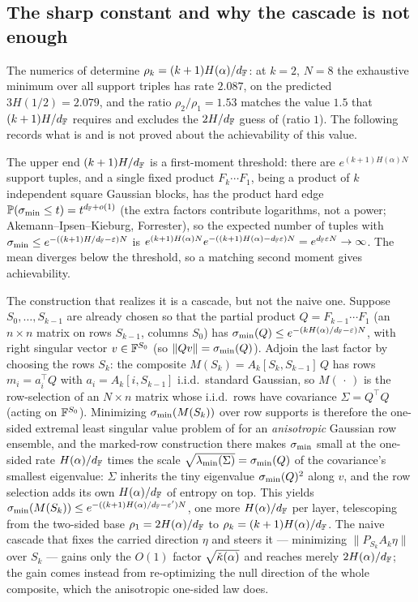 \subsection{The sharp constant and why the cascade is not enough}
\begin{remark}[Achievability of $(k+1)H/\dF$]\label{rem:achieve}
The numerics of  determine $\rho_k=(k+1)H(\alpha)/d_{\mathbb{F}}$: at $k=2$, $N=8$ the exhaustive
minimum over all support triples has rate $2.087$, on the predicted $3H(1/2)=2.079$, and the ratio
$\rho_2/\rho_1=1.53$ matches the value $1.5$ that $(k+1)H/\dF$ requires and excludes the $2H/d_{\mathbb{F}}$ guess of
\cite{shmaloProducts} (ratio $1$). The following records what is and is not proved about the
achievability of this value.

The upper end $(k+1)H/\dF$ is a first-moment threshold: there are $e^{(k+1)H(\alpha)N}$ support tuples, and
a single fixed product $F_k\cdots F_1$, being a product of $k$ independent square Gaussian blocks, has the
product hard edge $\mathbb{P}(\sigma_{\min}\le t)=t^{d_{\mathbb{F}}+o(1)}$ (the extra factors contribute logarithms, not a power;
Akemann--Ipsen--Kieburg, Forrester), so the expected number of tuples with $\sigma_{\min}\le
e^{-((k+1)H/d_{\mathbb{F}}-\varepsilon)N}$ is $e^{(k+1)H(\alpha)N}e^{-((k+1)H(\alpha)-d_{\mathbb{F}}\varepsilon)N}=e^{d_{\mathbb{F}}\varepsilon N}\to\infty$. The
mean diverges below the threshold, so a matching second moment gives achievability.

The construction that realizes it is a cascade, but not the naive one. Suppose $S_0,\dots,S_{k-1}$ are
already chosen so that the partial product $Q=F_{k-1}\cdots F_1$ (an $n\times n$ matrix on rows $S_{k-1}$,
columns $S_0$) has $\sigma_{\min}(Q)\le e^{-(kH(\alpha)/d_{\mathbb{F}}-\varepsilon)N}$, with right singular vector $v\in\mathbb{F}^{S_0}$ (so
$\|Qv\|=\sigma_{\min}(Q)$). Adjoin the last factor by choosing the rows $S_k$: the composite
$M(S_k)=A_k[S_k,S_{k-1}]\,Q$ has rows $m_i=a_i^\top Q$ with $a_i=A_k[i,S_{k-1}]$ i.i.d.\ standard Gaussian,
so $M(\,\cdot\,)$ is the row-selection of an $N\times n$ matrix whose i.i.d.\ rows have covariance
$\Sigma=Q^\top Q$ (acting on $\mathbb{F}^{S_0}$). Minimizing $\sigma_{\min}(M(S_k))$ over row supports is therefore the
one-sided extremal least singular value problem of \cite{shmaloBAMS} for an \emph{anisotropic} Gaussian
row ensemble, and the marked-row construction there makes $\sigma_{\min}$ small at the one-sided rate
$H(\alpha)/d_{\mathbb{F}}$ times the scale $\sqrt{\lambda_{\min}(\Sigma)}=\sigma_{\min}(Q)$ of the covariance's smallest
eigenvalue: $\Sigma$ inherits the tiny eigenvalue $\sigma_{\min}(Q)^2$ along $v$, and the row selection adds its
own $H(\alpha)/d_{\mathbb{F}}$ of entropy on top. This yields $\sigma_{\min}(M(S_k))\le e^{-((k+1)H(\alpha)/d_{\mathbb{F}}-\varepsilon')N}$, one
more $H(\alpha)/d_{\mathbb{F}}$ per layer,
telescoping from the two-sided base $\rho_1=2H(\alpha)/d_{\mathbb{F}}$ to $\rho_k=(k+1)H(\alpha)/d_{\mathbb{F}}$. The naive
cascade that fixes the carried direction $\eta$ and steers it --- minimizing $\|P_{S_k}A_k\eta\|$ over
$S_k$ --- gains only the $O(1)$ factor $\sqrt{\check{\kappa}(\alpha)}$ and reaches merely $2H(\alpha)/d_{\mathbb{F}}$; the
gain comes instead from re-optimizing the null direction of the whole composite, which the anisotropic
one-sided law does.


\end{remark}
